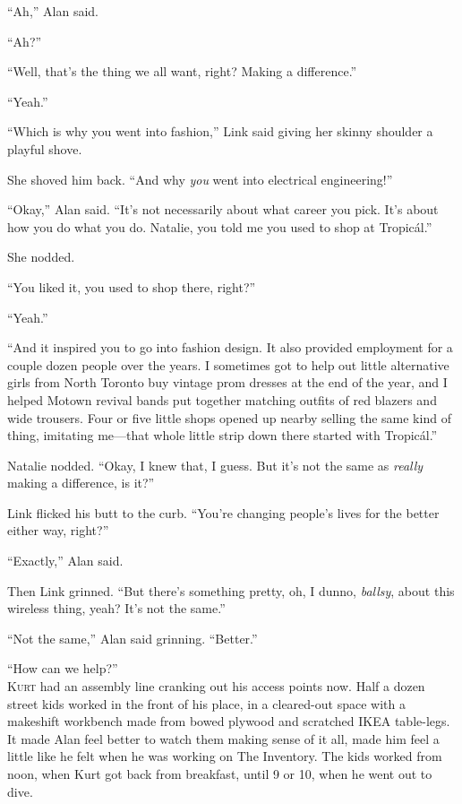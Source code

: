``Ah,'' Alan said.

``Ah?''

``Well, that's the thing we all want, right?  Making a difference.''

``Yeah.''

``Which is why you went into fashion,'' Link said giving her skinny
shoulder a playful shove.

She shoved him back.  ``And why \textit{you} went into electrical
engineering!''

``Okay,'' Alan said.  ``It's not necessarily about what career you
pick.  It's about how you do what you do.  Natalie, you told me you
used to shop at Tropic\'{a}l.''

She nodded.

``You liked it, you used to shop there, right?''

``Yeah.''

``And it inspired you to go into fashion design.  It also provided
employment for a couple dozen people over the years.  I sometimes got
to help out little alternative girls from North Toronto buy vintage
prom dresses at the end of the year, and I helped Motown revival bands
put together matching outfits of red blazers and wide trousers.  Four
or five little shops opened up nearby selling the same kind of thing,
imitating me---that whole little strip down there started with
Tropic\'{a}l.''

Natalie nodded.  ``Okay, I knew that, I guess.  But it's not the same
as \textit{really} making a difference, is it?''

Link flicked his butt to the curb.  ``You're changing people's lives
for the better either way, right?''

``Exactly,'' Alan said.

Then Link grinned.  ``But there's something pretty, oh, I dunno,
\textit{ballsy}, about this wireless thing, yeah?  It's not the
same.''

``Not the same,'' Alan said grinning.  ``Better.''

``How can we help?''
\\
\lettrine[lines=3, lhang=.5, nindent=0pt, findent=2pt]{K}{urt} had an assembly line cranking out his access points now.  Half a
dozen street kids worked in the front of his place, in a cleared-out
space with a makeshift workbench made from bowed plywood and scratched
IKEA table-legs.  It made Alan feel better to watch them making sense
of it all, made him feel a little like he felt when he was working on
The Inventory.  The kids worked from noon, when Kurt got back from
breakfast, until 9 or 10, when he went out to dive.

